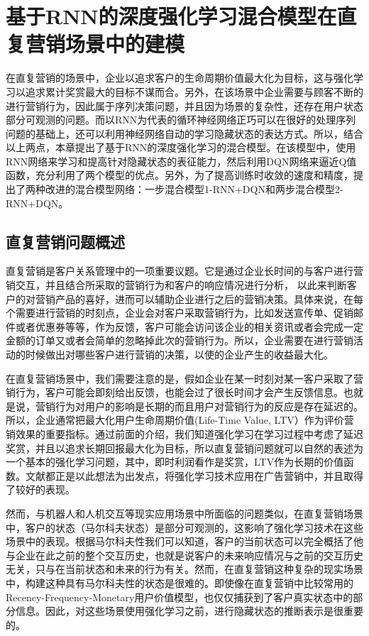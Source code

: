 \chapter{基于RNN的深度强化学习混合模型在直复营销场景中的建模}
在直复营销的场景中，企业以追求客户的生命周期价值最大化为目标，这与强化学习以追求累计奖赏最大的目标不谋而合。另外，在该场景中企业需要与顾客不断的进行营销行为，因此属于序列决策问题，并且因为场景的复杂性，还存在用户状态部分可观测的问题。而以RNN为代表的循环神经网络正巧可以在很好的处理序列问题的基础上，还可以利用神经网络自动的学习隐藏状态的表达方式。所以，结合以上两点，本章提出了基于RNN的深度强化学习的混合模型。在该模型中，使用RNN网络来学习和提高针对隐藏状态的表征能力，然后利用DQN网络来逼近Q值函数，充分利用了两个模型的优点。另外，为了提高训练时收敛的速度和精度，提出了两种改进的混合模型网络：一步混合模型1-RNN+DQN和两步混合模型2-RNN+DQN。

\section{直复营销问题概述}
直复营销是客户关系管理中的一项重要议题。它是通过企业长时间的与客户进行营销交互，并且结合所采取的营销行为和客户的响应情况进行分析，
以此来判断客户的对营销产品的喜好，进而可以辅助企业进行之后的营销决策。具体来说，在每个需要进行营销的时刻点，企业会对客户采取营销行为，比如发送宣传单、促销邮件或者优惠券等等，作为反馈，客户可能会访问该企业的相关资讯或者会完成一定金额的订单又或者会简单的忽略掉此次的营销行为。所以，企业需要在进行营销活动的时候做出对哪些客户进行营销的决策，以使的企业产生的收益最大化。

在直复营销场景中，我们需要注意的是，假如企业在某一时刻对某一客户采取了营销行为，客户可能会即刻给出反馈，也能会过了很长时间才会产生反馈信息。也就是说，营销行为对用户的影响是长期的而且用户对营销行为的反应是存在延迟的。所以，企业通常把最大化用户生命周期价值(Life-Time Value, LTV）作为评价营销效果的重要指标\citep{dwyer1997customer}。通过前面的介绍，我们知道强化学习在学习过程中考虑了延迟奖赏，并且以追求长期回报最大化为目标，所以直复营销问题就可以自然的表述为一个基本的强化学习问题，其中，即时利润看作是奖赏，LTV作为长期的价值函数。文献\citep{tkachenko2015autonomous,pednault2002sequential,silver2013concurrent}都正是以此想法为出发点，将强化学习技术应用在广告营销中，并且取得了较好的表现。

然而，与机器人和人机交互等现实应用场景中所面临的问题类似，在直复营销场景中，客户的状态（马尔科夫状态）是部分可观测的，这影响了强化学习技术在这些场景中的表现。根据马尔科夫性我们可以知道，客户的当前状态可以完全概括了他与企业在此之前的整个交互历史，也就是说客户的未来响应情况与之前的交互历史无关，只与在当前状态和未来的行为有关。然而，在直复营销这种复杂的现实场景中，构建这种具有马尔科夫性的状态是很难的。即使像在直复营销中比较常用的Recency-Frequency-Monetary用户价值模型\citep{tkachenko2015autonomous}，也仅仅捕获到了客户真实状态中的部分信息。因此，对这些场景使用强化学习之前，进行隐藏状态的推断表示是很重要的。


